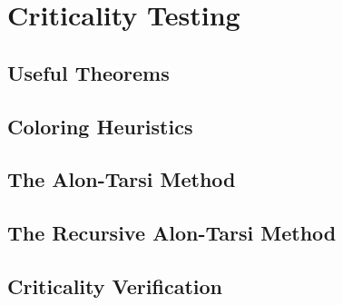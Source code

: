 \section{Criticality Testing}

\subsection{Useful Theorems}
\subsection{Coloring Heuristics}
\subsection{The Alon-Tarsi Method}
\subsection{The Recursive Alon-Tarsi Method}
\subsection{Criticality Verification}